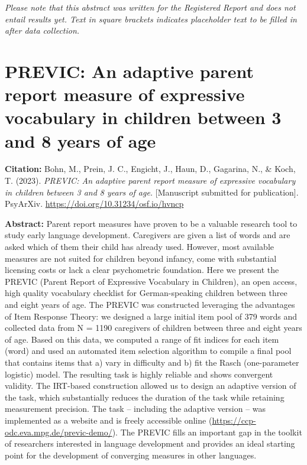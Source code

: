\documentclass[
]{scrbook}
\begin{document}
\emph{Please note that this abstract was written for the Registered Report and does not entail results yet. Text in square brackets indicates placeholder text to be filled in after data collection.}

\newpage

\section*{PREVIC: An adaptive parent report measure of expressive vocabulary in children between 3 and 8 years of age}\label{previc}

\textbf{Citation:} Bohn, M., Prein, J. C., Engicht, J., Haun, D., Gagarina, N., \& Koch, T. (2023). \emph{PREVIC: An adaptive parent report measure of expressive vocabulary in children between 3 and 8 years of age.} {[}Manuscript submitted for publication{]}. PsyArXiv. \mbox{\url{https://doi.org/10.31234/osf.io/hvncp}}

\textbf{Abstract:} Parent report measures have proven to be a valuable research tool to study early language development. Caregivers are given a list of words and are asked which of them their child has already used. However, most available measures are not suited for children beyond infancy, come with substantial licensing costs or lack a clear psychometric foundation. Here we present the PREVIC (Parent Report of Expressive Vocabulary in Children), an open access, high quality vocabulary checklist for German-speaking children between three and eight years of age. The PREVIC was constructed leveraging the advantages of Item Response Theory: we designed a large initial item pool of 379 words and collected data from N = 1190 caregivers of children between three and eight years of age. Based on this data, we computed a range of fit indices for each item (word) and used an automated item selection algorithm to compile a final pool that contains items that a) vary in difficulty and b) fit the Rasch (one-parameter logistic) model. The resulting task is highly reliable and shows convergent validity. The IRT-based construction allowed us to design an adaptive version of the task, which substantially reduces the duration of the task while retaining measurement precision. The task -- including the adaptive version -- was implemented as a website and is freely accessible online (\mbox{\url{https://ccp-odc.eva.mpg.de/previc-demo/}}). The PREVIC fills an important gap in the toolkit of researchers interested in language development and provides an ideal starting point for the development of converging measures in other languages.
\end{document}
